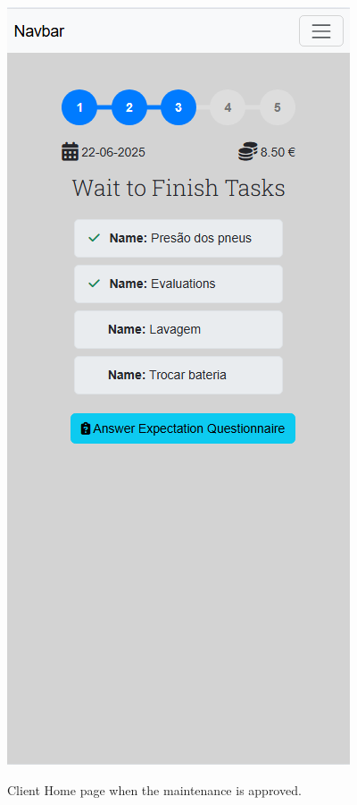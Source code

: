 \begin{figure}[htbp]
  \caption{Client Home page when the maintenance is approved.}
  \centering
  \includegraphics[width=\textwidth]{figs/Implementation/client/MaintenanceState3}
  \label{fig:MaintenanceState3}
\end{figure}


